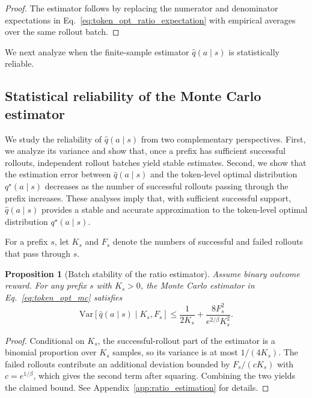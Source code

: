 \documentclass{article}
\newtheorem{proposition}{Proposition}[section]
\begin{document}
\begin{proof}
The estimator follows by replacing the numerator and denominator expectations in Eq.~\eqref{eq:token_opt_ratio_expectation} with empirical averages over the same rollout batch.
\end{proof}

We next analyze when the finite-sample estimator $\widehat q(a\mid s)$ is statistically reliable.


\subsection{Statistical reliability of the Monte Carlo estimator}
\label{sec:ratio_feasibility}


We study the reliability of $\widehat q(a\mid s)$ from two complementary perspectives.
First, we analyze its variance and show that, once a prefix has sufficient successful rollouts, independent rollout batches yield stable estimates.
Second, we show that the estimation error between $\widehat q(a\mid s)$ and the token-level optimal distribution $q^\star(a\mid s)$ decreases as the number of successful rollouts passing through the prefix increases.
These analyses imply that, with sufficient successful support, $\widehat q(a\mid s)$ provides a stable and accurate approximation to the token-level optimal distribution $q^\star(a\mid s)$.

For a prefix $s$, let $K_s$ and $F_s$ denote the numbers of successful and failed rollouts that pass through $s$.

\begin{proposition}[Batch stability of the ratio estimator]
\label{prop:main_ratio_variance}
Assume binary outcome reward. For any prefix $s$ with $K_s>0$, the Monte Carlo estimator in Eq.~\eqref{eq:token_opt_mc} satisfies
\begin{equation}
\mathrm{Var}\!\left[\widehat q(a \mid s)\mid K_s,F_s\right]
\le
\frac{1}{2K_s}
+
\frac{8F_s^2}{e^{2/\beta}K_s^2}.
\label{eq:ratio_feasibility_summary}
\end{equation}
\end{proposition}

\begin{proof}
Conditional on $K_s$, the successful-rollout part of the estimator is a binomial proportion over $K_s$ samples, so its variance is at most $1/(4K_s)$. The failed rollouts contribute an additional deviation bounded by $F_s/(cK_s)$ with $c=e^{1/\beta}$, which gives the second term after squaring. Combining the two yields the claimed bound. See Appendix~\ref{app:ratio_estimation} for details.
\end{proof}
\end{document}
